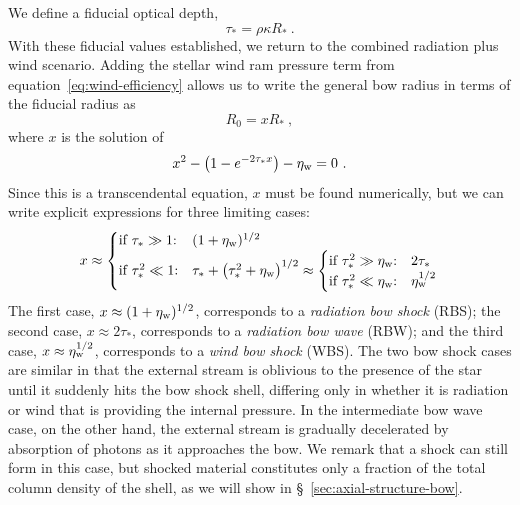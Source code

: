 We define a fiducial optical depth,
\begin{equation}
  \label{eq:tau-star}
  \tau_* = \rho \kappa R_* \ .
\end{equation}
With these fiducial values established, we return to the combined
radiation plus wind scenario.  Adding the stellar wind ram pressure
term from equation~\eqref{eq:wind-efficiency} allows us to write the
general bow radius in terms of the fiducial radius as
\begin{equation}
  \label{eq:R0-definition}
  R_0 = x R_* \ ,
\end{equation}
where \(x\) is the solution of
\begin{equation}
  \label{eq:rad-full-x}
  x^2 - \bigl(1 - e^{-2 \tau_* x} \bigr) - \eta_{\text{w}} = 0 \ .
\end{equation}
Since this is a transcendental equation, \(x\) must be found
numerically, but we can write explicit expressions for three limiting
cases:
\begin{equation}
  \label{eq:x-cases}
  x \approx
  \begin{cases}
    \text{if \(\tau_* \gg 1\):} & (1 + \eta_{\text{w}})^{1/2}  \\
    \text{if \(\tau_*^2 \ll 1\):} & \tau_* + \bigl( \tau_*^2 + \eta_{\text{w}} \bigr)^{1/2} \approx
    \begin{cases}
      \text{if \(\tau_*^2 \gg \eta\ensuremath{_{\text{w}}}\):} & 2 \tau_*  \\
      \text{if \(\tau_*^2 \ll \eta\ensuremath{_{\text{w}}}\):} & \eta_{\text{w}}^{1/2} 
    \end{cases}
  \end{cases}
\end{equation}
The first case, \(x \approx (1 + \eta_{\text{w}})^{1/2}\), corresponds to a
\textit{radiation bow shock} (RBS); the second case,
\(x \approx 2 \tau_* \), corresponds to a \textit{radiation bow wave} (RBW);
and the third case, \(x \approx \eta_{\text{w}}^{1/2}\), corresponds to a
\textit{wind bow shock} (WBS).  The two bow shock cases are similar in
that the external stream is oblivious to the presence of the star
until it suddenly hits the bow shock shell, differing only in whether
it is radiation or wind that is providing the internal pressure.  In
the intermediate bow wave case, on the other hand, the external stream
is gradually decelerated by absorption of photons as it approaches the
bow.  We remark that a shock can still form in this case, but shocked
material constitutes only a fraction of the total column density of
the shell, as we will show in \S~\ref{sec:axial-structure-bow}.

